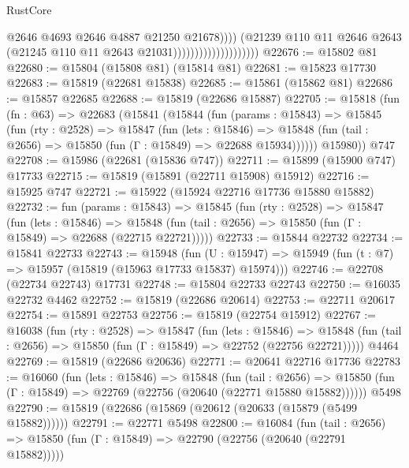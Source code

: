 \begin{lexlean}{RustCore}
\begin{coremodule}
                                                @2646
                                                @4693
                                                @2646
                                                @4887
                                                @21250
                                                @21678))))
                                        (@21239
                                          @110
                                          @11
                                          @2646
                                          @2643
                                          (@21245 @110 @11 @2643 @21031))))))))))))))))))))
@22676 := @15802 @81
@22680 := @15804 (@15808 @81) (@15814 @81)
@22681 := @15823 @17730
@22683 := @15819 (@22681 @15838)
@22685 := @15861 (@15862 @81)
@22686 := @15857 @22685
@22688 := @15819 (@22686 @15887)
@22705 := @15818
    (fun (fn : @63) =>
    @22683
      (@15841
        (@15844
          (fun (params : @15843) =>
          @15845
            (fun (rty : @2528) =>
            @15847
              (fun (lets : @15846) =>
              @15848 (fun (tail : @2656) => @15850 (fun (Γ : @15849) => @22688 @15934))))))
        @15980))
    @747
@22708 := @15986 (@22681 (@15836 @747))
@22711 := @15899 (@15900 @747) @17733
@22715 := @15819 (@15891 (@22711 @15908) @15912)
@22716 := @15925 @747
@22721 := @15922 (@15924 @22716 @17736 @15880 @15882)
@22732 := fun (params : @15843) =>
  @15845
    (fun (rty : @2528) =>
    @15847
      (fun (lets : @15846) =>
      @15848 (fun (tail : @2656) => @15850 (fun (Γ : @15849) => @22688 (@22715 @22721)))))
@22733 := @15844 @22732
@22734 := @15841 @22733
@22743 := @15948
    (fun (U : @15947) => @15949 (fun (t : @7) => @15957 (@15819 (@15963 @17733 @15837) @15974)))
@22746 := @22708 (@22734 @22743) @17731
@22748 := @15804 @22733 @22743
@22750 := @16035 @22732 @4462
@22752 := @15819 (@22686 @20614)
@22753 := @22711 @20617
@22754 := @15891 @22753
@22756 := @15819 (@22754 @15912)
@22767 := @16038
    (fun (rty : @2528) =>
    @15847
      (fun (lets : @15846) =>
      @15848 (fun (tail : @2656) => @15850 (fun (Γ : @15849) => @22752 (@22756 @22721)))))
    @4464
@22769 := @15819 (@22686 @20636)
@22771 := @20641 @22716 @17736
@22783 := @16060
    (fun (lets : @15846) =>
    @15848
      (fun (tail : @2656) =>
      @15850 (fun (Γ : @15849) => @22769 (@22756 (@20640 (@22771 @15880 @15882))))))
    @5498
@22790 := @15819 (@22686 (@15869 (@20612 (@20633 (@15879 (@5499 @15882))))))
@22791 := @22771 @5498
@22800 := @16084
    (fun (tail : @2656) => @15850 (fun (Γ : @15849) => @22790 (@22756 (@20640 (@22791 @15882)))))

\end{coremodule}
\end{lexlean}
